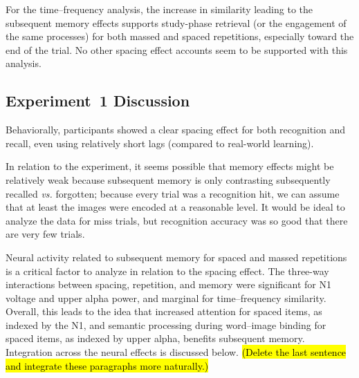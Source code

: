 For the time--frequency analysis, the increase in similarity leading to the subsequent memory effects supports study-phase retrieval (or the engagement of the same processes) for both massed and spaced repetitions, especially toward the end of the trial.  No other spacing effect accounts seem to be supported with this analysis.







\subsection{Experiment~1 Discussion}

Behaviorally, participants showed a clear spacing effect for both recognition and recall, even using relatively short lags (compared to real-world learning).

In relation to the experiment, it seems possible that memory effects might be relatively weak because subsequent memory is only contrasting subsequently recalled \textit{vs.} forgotten; because every trial was a recognition hit, we can assume that at least the images were encoded at a reasonable level.  It would be ideal to analyze the data for miss trials, but recognition accuracy was so good that there are very few trials.

\cbstart
Neural activity related to subsequent memory for spaced and massed repetitions is a critical factor to analyze in relation to the spacing effect. The three-way interactions between spacing, repetition, and memory were significant for N1 voltage and upper alpha power, and marginal for time--frequency similarity.  Overall, this leads to the idea that increased attention for spaced items, as indexed by the N1, and semantic processing during word--image binding for spaced items, as indexed by upper alpha, benefits subsequent memory.
Integration across the neural effects is discussed below.  \hl{(Delete the last sentence and integrate these paragraphs more naturally.)}


